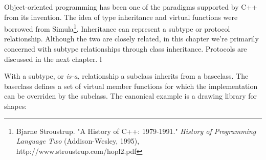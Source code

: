 Object-oriented programming has been one of the paradigms supported by C++ from its invention. The idea of type inheritance and virtual functions were borrowed from Simula\footnote{Bjarne Stroustrup. "A History of C++: 1979-1991." \textit{History of Programming Language Two} (Addison-Wesley, 1995), http://www.stroustrup.com/hopl2.pdf}. Inheritance can represent a subtype or protocol relationship. Although the two are closely related, in this chapter we're primarily concerned with subtype relationships through class inheritance. Protocols are discussed in the next chapter. l

With a subtype, or \textit{is-a}, relationship a subclass inherits from a baseclass. The baseclass defines a set of virtual member functions for which the implementation can be overriden by the subclass. The canonical example is a drawing library for shapes:

\begin{minipage}{\linewidth}
	
\end{minipage}


\begin{minipage}{\linewidth}
	
\end{minipage}


